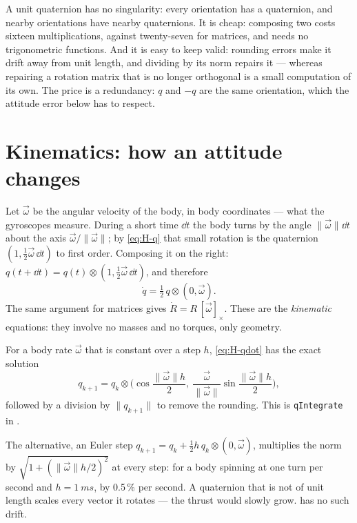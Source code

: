 \begin{keyidea}
A unit quaternion has no singularity: every orientation has a quaternion, and nearby orientations have nearby quaternions. It is cheap: composing two costs sixteen multiplications, against twenty-seven for matrices, and needs no trigonometric functions. And it is easy to keep valid: rounding errors make it drift away from unit length, and dividing by its norm repairs it — whereas repairing a rotation matrix that is no longer orthogonal is a small computation of its own. The price is a redundancy: $q$ and $-q$ are the same orientation, which the attitude error below has to respect.
\end{keyidea}

\section{Kinematics: how an attitude changes}

Let $\vec\omega$ be the angular velocity of the body, in body coordinates — what the gyroscopes measure. During a short time $\dd t$ the body turns by the angle $\|\vec\omega\|\dd t$ about the axis $\vec\omega/\|\vec\omega\|$; by \cref{eq:H-q} that small rotation is the quaternion $(1, \tfrac12\vec\omega\,\dd t)$ to first order. Composing it on the right:
$q(t + \dd t) = q(t) \otimes (1, \tfrac12\vec\omega\,\dd t)$, and therefore
\begin{equation}\label{eq:H-qdot}
  \dot q = \tfrac12\,q \otimes (0, \vec\omega) .
\end{equation}
The same argument for matrices gives $\dot R = R\,[\vec\omega]_\times$. These are the \emph{kinematic} equations: they involve no masses and no torques, only geometry.

\begin{result}
For a body rate $\vec\omega$ that is constant over a step $h$, \cref{eq:H-qdot} has the exact solution
\begin{equation}\label{eq:H-step}
  q_{k+1} = q_k \otimes \Big(\cos\frac{\|\vec\omega\|h}{2},\ \frac{\vec\omega}{\|\vec\omega\|}\sin\frac{\|\vec\omega\|h}{2}\Big) ,
\end{equation}
followed by a division by $\|q_{k+1}\|$ to remove the rounding. This is \texttt{qIntegrate} in .
\end{result}

The alternative, an Euler step $q_{k+1} = q_k + \tfrac12h\,q_k \otimes (0, \vec\omega)$, multiplies the norm by $\sqrt{1 + (\|\vec\omega\|h/2)^2}$ at every step: for a body spinning at one turn per second and $h = \SI{1}{ms}$, by 0.5\,\% per second. A quaternion that is not of unit length scales every vector it rotates — the thrust would slowly grow.  has no such drift.

